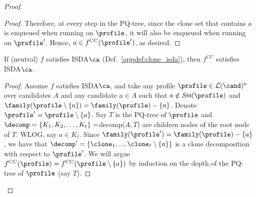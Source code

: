 \begin{proof}
\begin{proof}
 Therefore, at every step in the PQ-tree, since the clone set that contains $a$ is enqueued when running  on $\profile$, it will also be enqueued when running  on $\profile'$. Hence, $a \in f^{CC}(\profile')$, as desired.
\end{proof}    


\begin{lemma}\label{lemma:cc_isda}
If  (neutral) $f$ satisfies ISDA$\ca$ (Def.~\ref{appdef:clone_isda}), then $f^{CC}$ satisfies ISDA$\ca$.
\end{lemma}
\begin{proof}
    Assume $f$ satisfies ISDA$\ca$, and take any profile $\profile \in \mathcal{L}(\cand)^n$ over candidates $A$ and any candidate $a\in A$ such that $a \notin \textit{Sm}(\profile)$ and $\family(\profile \setminus\{a\}) = \family(\profile) - \{a\}$. Denote $\profile'=\profile \setminus\{a\}$. Say $T$ is the PQ-tree of $\profile$ and $\decomp=\{K_1,K_2, \ldots , K_\ell\}=$decomp($A,T$) are children nodes of the root node of $T$. WLOG, say $a \in K_\ell$. Since $\family(\profile') = \family(\profile) - \{a\}$, we have that $\decomp' = \{\clone_1, ... , \clone_\ell \setminus \{a\} \}$ is a clone decomposition with respect to $\profile'$. We will argue $f^{CC}(\profile) = f^{CC}(\profile\setminus \{a\})$ by induction on the depth of the PQ-tree of $\profile$ (say $T$). 


\end{proof}
\end{proof}
